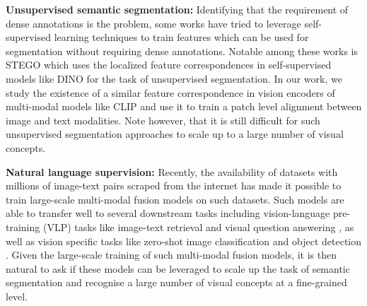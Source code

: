 \documentclass[10pt,twocolumn,letterpaper]{article}
\begin{document}
\textbf{Unsupervised semantic segmentation:} Identifying that the requirement of dense annotations is the problem, some works \cite{cho2021picie, hwang2019segsort, van2021unsupervised, hamilton2022unsupervised, melas2022deep, wang2022tokencut} have tried to leverage self-supervised learning techniques to train features which can be used for segmentation without requiring dense annotations. Notable among these works is STEGO \cite{hamilton2022unsupervised} which uses the localized feature correspondences in self-supervised models like DINO \cite{caron2021emerging} for the task of unsupervised segmentation. In our work, we study the existence of a similar feature correspondence in vision encoders of multi-modal models like CLIP \cite{radford2021learning} and use it to train a patch level alignment between image and text modalities. Note however, that it is still difficult for such unsupervised segmentation approaches to scale up to a large number of visual concepts.

\textbf{Natural language supervision:} Recently, the availability of datasets with millions of image-text pairs scraped from the internet has made it possible to train large-scale multi-modal fusion models on such datasets. Such models \cite{radford2021learning, jia2021scaling, kim2021vilt, singh2022flava, yu2022coca, yuan2021florence} are able to transfer well to several downstream tasks including vision-language pre-training (VLP) \cite{chen2022vlp} tasks like image-text retrieval \cite{wang2016comprehensive} and visual question answering \cite{antol2015vqa}, as well as vision specific tasks like zero-shot image classification \cite{radford2021learning, jia2021scaling, yu2022coca} and object detection \cite{zhang2022glipv2, kamath2021mdetr}. Given the large-scale training of such multi-modal fusion models, it is then natural to ask if these models can be leveraged to scale up the task of semantic segmentation and recognise a large number of visual concepts at a fine-grained level.
\end{document}
